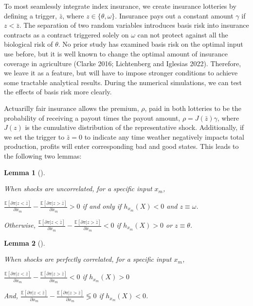 \documentclass[
  letterpaper,
  DIV=11,
  numbers=noendperiod]{scrartcl}
\theoremstyle{plain}
\newtheorem{lemma}{Lemma}[section]
\theoremstyle{plain}
\theoremstyle{remark}
\begin{document}
To most seamlessly integrate index insurance, we create insurance
lotteries by defining a trigger, \(\bar z\), where
\(z\in\{\theta,\omega\}\). Insurance pays out a constant amount
\(\gamma\) if \(z<\bar z\). The separation of two random variables
introduces basis risk into insurance contracts as a contract triggered
solely on \(\omega\) can not protect against all the biological risk of
\(\theta\). No prior study has examined basis risk on the optimal input
use before, but it is well known to change the optimal amount of
insurance coverage in agriculture (Clarke 2016; Lichtenberg and Iglesias
2022). Therefore, we leave it as a feature, but will have to impose
stronger conditions to achieve some tractable analytical results. During
the numerical simulations, we can test the effects of basis risk more
clearly.

Actuarilly fair insurance allows the premium, \(\rho\), paid in both
lotteries to be the probability of receiving a payout times the payout
amount, \(\rho=J(\bar z)\gamma\), where \(J(z)\) is the cumulative
distribution of the representative shock. Additionally, if we set the
trigger to \(\bar z=0\) to indicate any time weather negatively impacts
total production, profits will enter corresponding bad and good states.
This leads to the following two lemmas:

\begin{lemma}[]\protect\hypertarget{lem-mp}{}\label{lem-mp}

When shocks are uncorrelated, for a specific input \(x_m\),

\(\frac{\mathbb{E}[\partial \pi|z<\bar z]}{\partial x_m}-\frac{\mathbb{E}[\partial \pi|z>\bar z]}{\partial x_m}>0\)
if and only if \(h_{x_m}(X)<0\) and \(z\equiv\omega\).

Otherwise,
\(\frac{\mathbb{E}[\partial \pi|z<\bar z]}{\partial x_m}-\frac{\mathbb{E}[\partial \pi|z>\bar z]}{\partial x_m}<0\)
if \(h_{x_m}(X)>0\) or \(z\equiv \theta\).

\end{lemma}

\begin{lemma}[]\protect\hypertarget{lem-corr}{}\label{lem-corr}

When shocks are perfectly correlated, for a specific input \(x_m\),

\(\frac{\mathbb{E}[\partial \pi|z<\bar z]}{\partial x_m}-\frac{\mathbb{E}[\partial \pi|z>\bar z]}{\partial x_m}<0\)
if \(h_{x_m}(X)>0\)

And,
\(\frac{\mathbb{E}[\partial \pi|z<\bar z]}{\partial x_m}-\frac{\mathbb{E}[\partial \pi|z>\bar z]}{\partial x_m}\lessgtr 0\)
if \(h_{x_m}(X)<0\).

\end{lemma}
\end{document}
